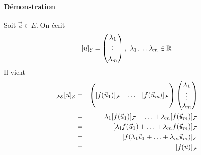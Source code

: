 \paragraph{Démonstration} Soit $\vec{u} \in E$. On écrit
$$[\vec{u}]_{\mathcal{E}} = \begin{pmatrix} \lambda_1 \\ \vdots \\ \lambda_m \end{pmatrix}, ~ \lambda_1, \ldots \lambda_m \in \mathbb{R}$$
Il vient
\begin{eqnarray*}
  [f]_{\cF \cE}[\vec{u}]_{\cE}
  &=& 
  \begin{pmatrix} \\ [f(\vec{u}_1)]_\cF & \ldots & [f(\vec{u}_m)]_\cF \\ \\ \end{pmatrix}
  \begin{pmatrix} \lambda_1 \\ \vdots \\ \lambda_m \end{pmatrix} \\
  &=& \lambda_1 [f(\vec{u}_1)]_\cF + \ldots + \lambda_m [f(\vec{u}_m)]_\cF \\
  &=& [\lambda_1 f(\vec{u}_1) + \ldots + \lambda_m f(\vec{u}_m)]_\cF \\
  &=& [ f( \lambda_1 \vec{u}_1 + \ldots + \lambda_m \vec{u}_m)]_\cF \\
  &=& [f(\vec{u})]_\cF
\end{eqnarray*}


